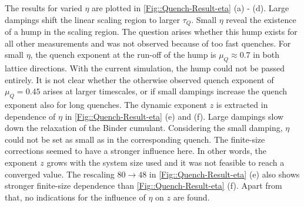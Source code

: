 	The results for varied $\eta$ are plotted in \def\figureautorefname{Figs.}\autoref{Fig::Quench-Result-eta}\def\figureautorefname{Fig.} (a) - (d). Large dampings shift the linear scaling region to larger $\tau_Q$. Small $\eta$ reveal the existence of a hump in the scaling region. The question arises whether this hump exists for all other measurements and was not observed because of too fast quenches. For small $\eta$, the quench exponent at the run-off of the hump is $\mu_Q \approx	0.7$ in both lattice directions. With the current simulation, the hump could not be passed entirely. It is not clear whether the otherwise observed quench exponent of $\mu_Q =	0.45$ arises at larger timescales, or if small dampings increase the quench exponent also for long quenches. The dynamic exponent $z$ is extracted in dependence of $\eta$ in \def\figureautorefname{Figs.}\autoref{Fig::Quench-Result-eta}\def\figureautorefname{Fig.} (e) and (f). Large dampings slow down the relaxation of the Binder cumulant. Considering the small damping, $\eta$ could not be set as small as in the corresponding quench. The finite-size corrections seemed to have a stronger influence here. In other words, the exponent $z$ grows with the system size used and it was not feasible to reach a converged value. The rescaling $80 \rightarrow 48$ in \autoref{Fig::Quench-Result-eta} (e) also shows stronger finite-size dependence than \autoref{Fig::Quench-Result-eta} (f). Apart from that, no indications for the influence of $\eta$ on $z$ are found.\\
	
